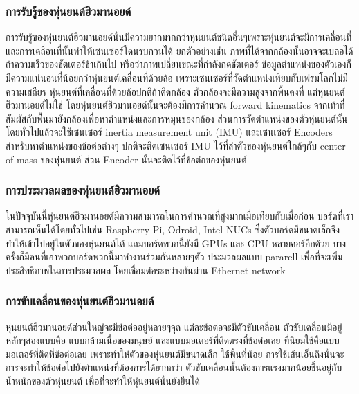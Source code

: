 \subsubsection*{การรับรู้ของหุ่นยนต์ฮิวมานอยด์}
การรับรู้ของหุ่นยนต์ฮิวมานอยด์นั้นมีความยากมากกว่าหุ่นยนต์ชนิดอื่นๆเพราะหุ่นยนต์จะมีการเคลื่อนที่ และการเคลื่อนที่นั้นทำให้เซนเซอร์โดนรบกวนได้
ยกตัวอย่างเช่น ภาพที่ได้จากกล้องนั้นอาจจะเบลอได้ถ้าความเร็วของชัตเตอร์ช้าเกินไป หรือว่าภาพเปลี่ยนขณะที่กำลังกดชัตเตอร์
ข้อมูลตำแหน่งของตัวเองก็มีความแน่นอนที่น้อยกว่าหุ่นยนต์เคลื่อนที่ด้วยล้อ เพราะเซนเซอร์ที่วัดตำแหน่งเทียบกับเฟรมโลกไม่มีความเสถียร
หุ่นยนต์ที่เคลื่อนที่ด้วยล้อปกติถ้าติดกล้อง ตัวกล้องจะมีความสูงจากพื้นคงที่ แต่หุ่นยนต์ฮิวมานอยด์ไม่ใช่ โดยหุ่นยนต์ฮิวมานอยด์นั้นจะต้องมีการคำนวณ
forward kinematics จากเท้าที่สัมผัสกับพื้นมายังกล้องเพื่อหาตำแหน่งและการหมุนของกล้อง ส่วนการวัดตำแหน่งของตัวหุ่นยนต์นั้น
โดยทั่วไปแล้วจะใช้เซนเซอร์ inertia measurement unit (IMU) และเซนเซอร์ Encoders สำหรับหาตำแหน่งของข้อต่อต่างๆ
ปกติจะติดเซนเซอร์ IMU ไว้ที่ลำตัวของหุ่นยนต์ใกล้ๆกับ center of mass ของหุ่นยนต์ ส่วน Encoder นั้นจะติดไว้ที่ข้อต่อของหุ่นยนต์

\subsubsection*{การประมวลผลของหุ่นยนต์ฮิวมานอยด์}
ในปัจจุบันนี้หุ่นยนต์ฮิวมานอยด์มีความสามารถในการคำนวณที่สูงมากเมื่อเทียบกับเมื่อก่อน บอร์ดที่เราสามารถเห็นได้โดยทั่วไปเช่น
Raspberry Pi, Odroid, Intel NUCs ซึ่งตัวบอร์ดมีขนาดเล็กจึงทำให้เข้าไปอยู่ในตัวของหุ่นยนต์ได้ แถมบอร์ดพวกนี้ยังมี GPUs
และ CPU หลายคอร์อีกด้วย บางครั้งก็มีคนที่เอาพวกบอร์ดพวกนี้มาทำงานร่วมกันหลายๆตัว ประมวลผลแบบ pararell เพื่อที่จะเพิ่มประสิทธิภาพในการประมวลผล
โดยเชื่อมต่อระหว่างกันผ่าน Ethernet network 

\subsubsection*{การขับเคลื่อนของหุ่นยนต์ฮิวมานอยด์}
หุ่นยนต์ฮิวมานอยด์ส่วนใหญ่จะมีข้อต่ออยู่หลายๆจุด แต่ละข้อต่อจะมีตัวขับเคลื่อน ตัวขับเคลื่อนมีอยู่หลักๆสองแบบคือ
แบบกล้ามเนื่อของมนุษย์ และแบบมอเตอร์ที่ติดตรงที่ข้อต่อเลย ที่นิยมใช้คือแบบมอเตอร์ที่ติดที่ข้อต่อเลย เพราะทำให้ตัวของหุ่นยนต์มีขนาดเล็ก
ใช้พื้นที่น้อย การใช้เส้นเอ็นดึงนั้นจะการจะทำให้ข้อต่อไปยังตำแหน่งที่ต้องการได้ยากกว่า ตัวขับเคลื่อนนั้นต้องการแรงมากน้อยขึ้นอยู่กับ
น้ำหนักของตัวหุ่นยนต์ เพื่อที่จะทำให้หุ่นยนต์นั้นยังยืนได้

